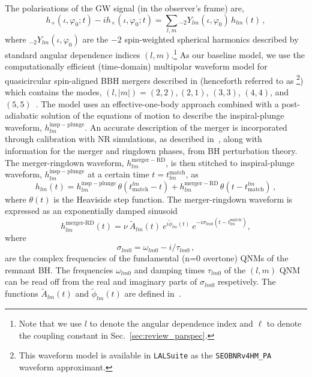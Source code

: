 The polarisations of the GW signal (in the observer's frame) are,
%
\begin{equation}
h_+(\iota,\varphi_0;t ) - i h_\times(\iota,\varphi_0;t) = \sum_{l, m} {}_{-\!2}Y_{l m}(\iota,\varphi_0)\, h_{l m}(t)\,,
\end{equation}
%
where ${}_{-\!2}Y_{l m}(\iota,\varphi_0)$ are the $-2$ spin-weighted spherical harmonics described by standard angular dependence indices $(l,m)$.\footnote{Note that we use $l$ to denote the angular dependence index and $\ell$ to denote the coupling constant in Sec.~\ref{sec:review_parspec}.} As our baseline model, we use the computationally efficient (time-domain) multipolar waveform model for quasicircular spin-aligned BBH mergers described in \cite{Mihaylov:2021bpf} (henceforth referred to as \SEOB{} \footnote{This waveform model is available in \texttt{LALSuite} \cite{lalsuite} as the \texttt{SEOBNRv4HM\_PA} waveform approximant.}) which contains the modes, $(l, |m|)=(2,2),(2,1)$, $(3,3)$, $(4,4)$, and $(5,5)$~\cite{Cotesta:2018fcv,Mihaylov:2021bpf}. The model uses an effective-one-body approach combined with a post-adiabatic solution of the equations of motion to describe the inspiral-plunge waveform, $h_{l m}^\mathrm{insp-plunge}$. An accurate description of the merger is incorporated through calibration with NR simulations, as described in~\cite{Cotesta:2018fcv}, along with information for the merger and ringdown phases, from BH perturbation theory. The merger-ringdown waveform, $h_{l m}^\mathrm{merger-RD}$, is then stitched to inspiral-plunge waveform, $h_{l m}^\mathrm{insp-plunge}$ at a certain time $t = t^{\textrm{match}}_{l m}$, as
%
\begin{equation}
h_{l m}(t) = h_{l m}^\mathrm{insp-plunge}\, \theta(t_\mathrm{match}^{l m} - t) + h_{l m}^\mathrm{merger-RD}\,\theta(t-t_\mathrm{match}^{l m})\,,
\end{equation}
%
where $\theta(t)$ is the Heaviside step function. The merger-ringdown waveform is expressed as an exponentially damped sinusoid ~\citep{Bohe:2016gbl,Cotesta:2018fcv,Mihaylov:2021bpf}
%
\begin{equation}
\label{RD}
h_{l m}^{\textrm{merger-RD}}(t) = \nu \ \tilde{A}_{l m}(t)\ e^{i \tilde{\phi}_{l m}(t)} \ e^{-i \sigma_{l m 0}(t-t^{\textrm{match}}_{l m})},
\end{equation}
%
where
%
\begin{equation}
\sigma_{l m0} = \omega_{l m 0} - i / \tau_{l m 0}\,,
\end{equation}
%
are the complex frequencies of the fundamental (n=0 overtone) QNMs of the remnant BH. The frequencies $\omega_{l m 0}$ and damping times $\tau_{l m 0}$ of the $(l, m)$ QNM can be read off from the real and imaginary parts of  $\sigma_{l m0}$ respetively. The functions $\tilde{A}_{l m}(t)$ and $\tilde{\phi}_{l m}(t)$ are defined in~\cite{Bohe:2016gbl,Cotesta:2018fcv}.

